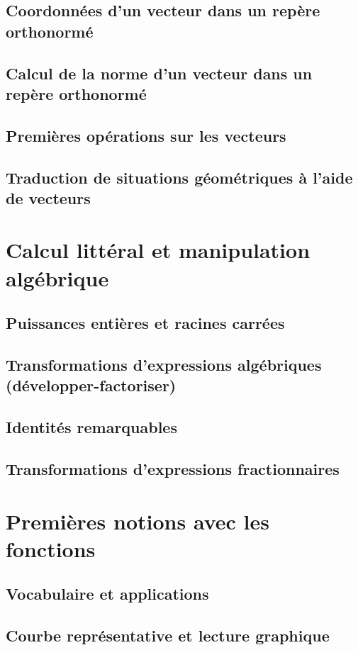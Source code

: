 \documentclass[10pt,a4paper]{article}
\theoremstyle{definition}
\theoremstyle{definition}
\begin{document}
\subsection{Coordonnées d'un vecteur dans un repère orthonormé}
\subsection{Calcul de la norme d'un vecteur dans un repère orthonormé}
\subsection{Premières opérations sur les vecteurs}
\subsection{Traduction de situations géométriques à l'aide de vecteurs}

\section{Calcul littéral et manipulation algébrique}
\subsection{Puissances entières et racines carrées}
\subsection{Transformations d’expressions algébriques (développer-factoriser)}
\subsection{Identités remarquables}
\subsection{Transformations d'expressions fractionnaires}

\section{Premières notions avec les fonctions}
\subsection{Vocabulaire et applications}
\subsection{Courbe représentative et lecture graphique}
\end{document}
